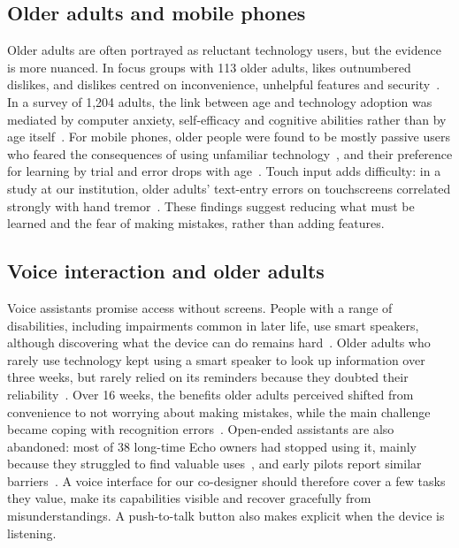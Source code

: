 \documentclass[acmtog,nonacm]{acmart}
\begin{document}
\subsection{Older adults and mobile phones}
Older adults are often portrayed as reluctant technology users, but the evidence is more nuanced. In focus groups with 113 older adults, likes outnumbered dislikes, and dislikes centred on inconvenience, unhelpful features and security~\cite{mitzner2010older}. In a survey of 1,204 adults, the link between age and technology adoption was mediated by computer anxiety, self-efficacy and cognitive abilities rather than by age itself~\cite{czaja2006factors}. For mobile phones, older people were found to be mostly passive users who feared the consequences of using unfamiliar technology~\cite{kurniawan2008older}, and their preference for learning by trial and error drops with age~\cite{leung2012older}. Touch input adds difficulty: in a study at our institution, older adults' text-entry errors on touchscreens correlated strongly with hand tremor~\cite{nicolau2012elderly}. These findings suggest reducing what must be learned and the fear of making mistakes, rather than adding features.

\subsection{Voice interaction and older adults}
Voice assistants promise access without screens. People with a range of disabilities, including impairments common in later life, use smart speakers, although discovering what the device can do remains hard~\cite{pradhan2018accessibility}. Older adults who rarely use technology kept using a smart speaker to look up information over three weeks, but rarely relied on its reminders because they doubted their reliability~\cite{pradhan2020use}. Over 16 weeks, the benefits older adults perceived shifted from convenience to not worrying about making mistakes, while the main challenge became coping with recognition errors~\cite{kim2021exploring}. Open-ended assistants are also abandoned: most of 38 long-time Echo owners had stopped using it, mainly because they struggled to find valuable uses~\cite{trajkova2020alexa}, and early pilots report similar barriers~\cite{kowalski2019older}. A voice interface for our co-designer should therefore cover a few tasks they value, make its capabilities visible and recover gracefully from misunderstandings. A push-to-talk button also makes explicit when the device is listening.
\end{document}
